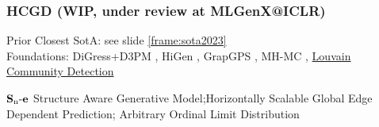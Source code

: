 \documentclass[./presentation.tex]{subfiles}
\begin{document}
\begin{frame}[t,label=hcgdintro]
  \frametitle{HCGD (WIP, under review at MLGenX@ICLR)}
  \vspace{-1cm}
  \begin{priorart}
    Prior Closest SotA: see slide \ref{frame:sota2023}\\%
    Foundations: DiGress+D3PM \citep{krawczukGGGANGeometricGraph2020,austinStructuredDenoisingDiffusion2021e}, HiGen \citep{karamiHiGenHierarchicalGraph2023a}, GrapGPS \citep{rampasekRecipeGeneralPowerful2022b}, MH-MC \citep{metropolisEquationStateCalculations1953a}, 
    \hyperlink{hcgdbackuplouvain}{Louvain Community Detection} \citep{newmanFindingEvaluatingCommunity2004,blondelFastUnfoldingCommunities2008d}
  \end{priorart}
  \begin{contributions}
    $\operatorname{\mathbf{S}_n\mathbf{-e}}$ Structure Aware Generative Model;Horizontally Scalable Global Edge Dependent Prediction; Arbitrary Ordinal Limit Distribution
  \end{contributions}
\end{frame}
\end{document}
